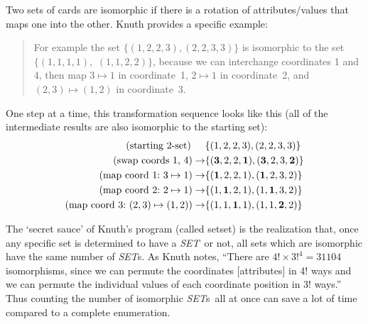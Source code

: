 \documentclass{article}
\theoremstyle{theorem}
\theoremstyle{definition}
\newcommand{\SET}{{\em SET}}
\newcommand{\SETs}{{\em SET}s}
\newcommand{\SETSET}{{\sc setset}}
\begin{document}
Two sets of cards are isomorphic if there is a rotation of attributes/values
that maps one into the other. Knuth provides a specific example:
\begin{quotation}For example the set $\{(1,2,2,3), (2,2,3,3)\}$ is
  isomorphic to the set $\{(1,1,1,1),$ $(1,1,2,2)\}$, because we can interchange
  coordinates 1 and 4, then map $3\mapsto 1$ in coordinate~1, $2\mapsto1$ in
  coordinate~2, and $(2,3)\mapsto(1,2)$ in coordinate~3.
\end{quotation}
One step at a time, this transformation sequence looks like this (all of the
intermediate results are also isomorphic to the starting set):
\begin{align*}
(\text{starting 2-set)\hspace{5mm}}&  \{(1,2,2,3), (2,2,3,3)\}  \\
  (\text{swap coords 1, 4})  \rightarrow & \{(\mathbf{3},2,2,\mathbf{1}), (\mathbf{3},2,3,\mathbf{2})\} \\
  (\text{map coord 1:~} 3\mapsto 1)\rightarrow & \{(\mathbf{1},2,2,1), (\mathbf{1},2,3,2)\} \\
  (\text{map coord 2:~} 2\mapsto 1)\rightarrow & \{(1,\mathbf{1},2,1), (1,\mathbf{1},3,2)\} \\
  (\text{map coord 3:~} (2,3)\mapsto(1,2))\rightarrow & \{(1,1,\mathbf{1},1), (1,1,\mathbf{2},2)\}
\end{align*}


The `secret sauce' of Knuth's program (called \SETSET) is the realization that,
once any specific set is determined to have a \SET~or not, all sets which are
isomorphic have the same number of \SETs. As Knuth notes, ``There are $4! \times
3!^4 = 31104$ isomorphisms, since we can permute the coordinates [attributes] in
4! ways and we can permute the individual values of each coordinate position in
3! ways.''  Thus counting the number of isomorphic \SETs~all at once can save a
lot of time compared to a complete enumeration.
\end{document}
